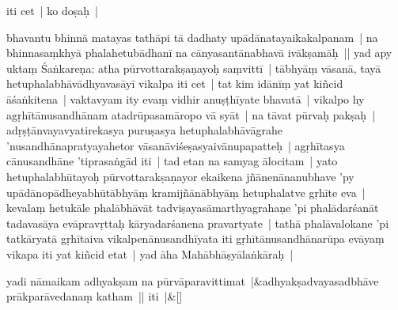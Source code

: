 \documentclass[article,12pt,a4paper]{memoir}
\newcommand{\persName}[1]{#1}
\begin{document}
iti cet | \label{thakur75-126.24a} ko doṣaḥ |
	\pend
      

	  \pstart bhavantu bhinnā matayas tathāpi tā dadhaty upādānatayaikakalpanam | na bhinnasaṃkhyā phalahetubādhanī na cānyasantānabhavā ivākṣamāḥ || \label{thakur75-126.29} yad apy uktaṃ \persName{Śaṅkareṇa}: atha pūrvottarakṣaṇayoḥ saṃvittī | tābhyāṃ vāsanā, tayā hetuphalabhāvādhyavasāyī vikalpa iti cet | \label{thakur75-126.30} tat kim idānīṃ yat kiñcid āśaṅkitena | vaktavyam ity evaṃ vidhir anuṣṭhīyate bhavatā | vikalpo hy agṛhītānusandhānam atadrūpasamāropo vā syāt | \label{thakur75-126.32} na tāvat pūrvaḥ pakṣaḥ | adṛṣṭānvayavyatirekasya puruṣasya hetuphalabhāvāgrahe 'nusandhānapratyayahetor vāsanāviśeṣasyaivānupapatteḥ | agṛhītasya cānusandhāne 'tiprasaṅgād iti | \label{thakur75-127.1} tad etan na samyag ālocitam | yato hetuphalabhūtayoḥ pūrvottarakṣaṇayor ekaikena jñānenānanubhave 'py upādānopādheyabhūtābhyāṃ kramijñānābhyāṃ hetuphalatve gṛhīte eva | kevalaṃ hetukāle phalābhāvāt tadviṣayasāmarthyagrahaṇe 'pi phalādarśanāt tadavasāya evāpravṛttaḥ kāryadarśanena pravartyate | tathā phalāvalokane 'pi tatkāryatā gṛhītaiva vikalpenānusandhīyata iti gṛhītānusandhānarūpa evāyaṃ vikapa iti yat kiñcid etat | \label{thakur75-127.7} yad āha Mahābhāṣyālaṅkāraḥ |
	\pend
      
	    
	    \stanza[\smallbreak]
	yadi nāmaikam adhyakṣam na pūrvāparavittimat |&adhyakṣadvayasadbhāve prākparāvedanaṃ katham || iti |\&[\smallbreak]


	
\end{document}
